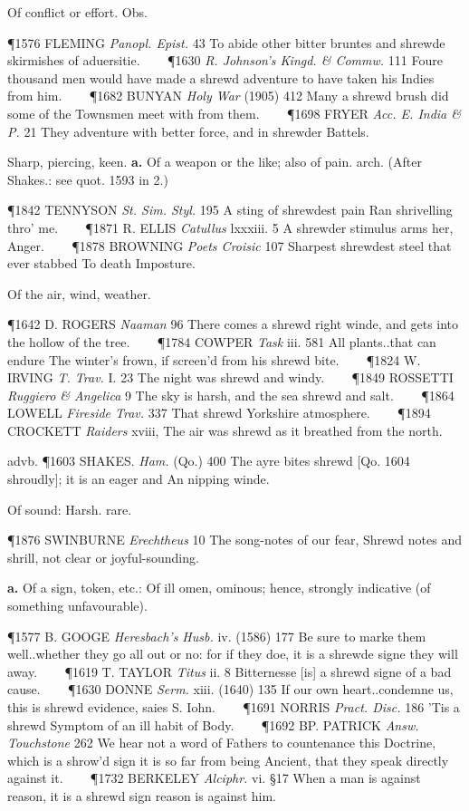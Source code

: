 \begin{description}[wide, labelwidth=!, labelindent=0pt]
\begin{myenumerate}
 Of conflict or effort. Obs.

\P 1576 FLEMING  \textit{Panopl. Epist.} 43 To abide other bitter bruntes and shrewde skirmishes of aduersitie.    
\P 1630 \textit{R. Johnson's  Kingd. \& Commw.} 111 Foure thousand men would have made a shrewd adventure to have taken his Indies from him.    
\P 1682 BUNYAN  \textit{Holy War} (1905) 412 Many a shrewd brush did some of the Townsmen meet with from them.    
\P 1698 FRYER  \textit{Acc. E. India \& P.} 21 They adventure with better force, and in shrewder Battels.

 Sharp, piercing, keen. \textbf{a.} Of a weapon or the like; also of pain. arch. (After Shakes.: see quot. 1593 in 2.) 

\P 1842 TENNYSON  \textit{St. Sim. Styl.} 195 A sting of shrewdest pain Ran shrivelling thro' me.    
\P 1871 R. ELLIS  \textit{Catullus} lxxxiii. 5 A shrewder stimulus arms her, Anger.    
\P 1878 BROWNING  \textit{Poets Croisic} 107 Sharpest shrewdest steel that ever stabbed To death Imposture.

 Of the air, wind, weather.

\P 1642 D. ROGERS  \textit{Naaman} 96 There comes a shrewd right winde, and gets into the hollow of the tree.    
\P 1784 COWPER  \textit{Task} iii. 581 All plants..that can endure The winter's frown, if screen'd from his shrewd bite.    
\P 1824 W. IRVING  \textit{T. Trav.} I. 23 The night was shrewd and windy.    
\P 1849 ROSSETTI  \textit{Ruggiero \& Angelica} 9 The sky is harsh, and the sea shrewd and salt.    
\P 1864 LOWELL  \textit{Fireside Trav.} 337 That shrewd Yorkshire atmosphere.    
\P 1894 CROCKETT  \textit{Raiders} xviii, The air was shrewd as it breathed from the north.

\noindent advb. \P 1603 SHAKES.  \textit{Ham.} (Qo.) 400 The ayre bites shrewd [Qo. 1604 shroudly];  it is an eager and An nipping winde.

 Of sound: Harsh. rare.

\P 1876 SWINBURNE  \textit{Erechtheus} 10 The song-notes of our fear, Shrewd notes and shrill, not clear or joyful-sounding.

 \textbf{a.} Of a sign, token, etc.: Of ill omen, ominous; hence, strongly indicative (of something unfavourable).

\P 1577 B. GOOGE  \textit{Heresbach's Husb.} iv. (1586) 177 Be sure to marke them well..whether they go all out or no: for if they doe, it is a shrewde signe they will away.    
\P 1619 T. TAYLOR  \textit{Titus} ii. 8 Bitternesse [is] a shrewd signe of a bad cause.    
\P 1630 DONNE  \textit{Serm.} xiii. (1640) 135 If our own heart..condemne us, this is shrewd evidence, saies S. Iohn.    
\P 1691 NORRIS  \textit{Pract. Disc.} 186 'Tis a shrewd Symptom of an ill habit of Body.    
\P 1692 BP. PATRICK  \textit{Answ. Touchstone} 262 We hear not a word of Fathers to countenance this Doctrine, which is a shrow'd sign it is so far from being Ancient, that they speak directly against it.    
\P 1732 BERKELEY  \textit{Alciphr.} vi. §17 When a man is against reason, it is a shrewd sign reason is against him.


\end{myenumerate}
\end{description}
